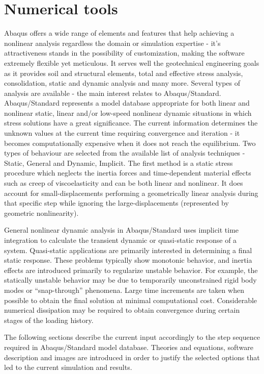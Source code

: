 \documentclass[10pt,a4paper]{report}
\begin{document}
\section{Numerical tools}
Abaqus offers a wide range of elements and features that help achieving a nonlinear analysis regardless the domain or simulation expertise - it's attractiveness stands in the possibility of customization, making the software extremely flexible yet meticulous. It serves well the geotechnical engineering goals as it provides soil and structural elements, total and effective stress analysis, consolidation, static and dynamic analysis and many more. Several types of analysis are available - the main interest relates to Abaqus/Standard.
Abaqus/Standard represents a model database appropriate for both linear and nonlinear static, linear and/or low-speed nonlinear dynamic situations in which stress solutions have a great significance. The current information determines the unknown values at the current time requiring convergence and iteration - it becomes computationally expensive when it does not reach the equilibrium. Two types of behaviour are selected from the available list of analysis techniques - Static, General and Dynamic, Implicit. The first method is a static stress procedure which neglects the inertia forces and time-dependent material effects such as creep of viscoelasticity and can be both linear and nonlinear. It does account for small-displacements performing a geometrically linear analysis during that specific step while ignoring the large-displacements (represented by geometric nonlinearity).

General nonlinear dynamic analysis in Abaqus/Standard uses implicit time integration to calculate the transient dynamic or quasi-static response of a system. Quasi-static applications are primarily interested in determining a final static response. These problems typically show monotonic behavior, and inertia effects are introduced primarily to regularize unstable behavior. For example, the statically unstable behavior may be due to temporarily unconstrained rigid body modes or “snap-through” phenomena. Large time increments are taken when possible to obtain the final solution at minimal computational cost. Considerable numerical dissipation may be required to obtain convergence during certain stages of the loading history.

The following sections describe the current input accordingly to the step sequence required in Abaqus/Standard model database. Theories and equations, software description and images are introduced in order to justify the selected options that led to the current simulation and results.
\end{document}
